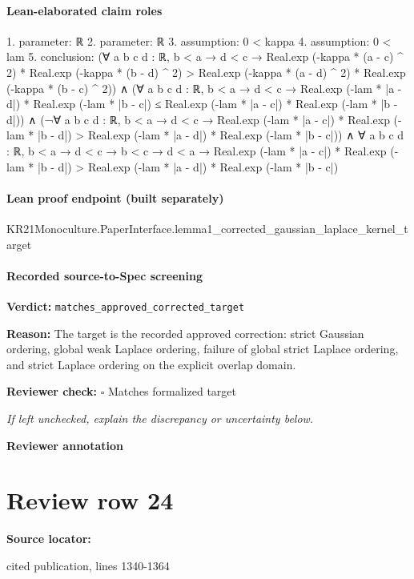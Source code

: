 \documentclass[10pt]{article}
\newcommand{\reviewerbox}{%
  \par\noindent\fbox{\parbox{0.96\linewidth}{\rule{0pt}{0.38in}}}\par
}
\newcommand{\reviewmatch}[1]{%
  \par\noindent\textbf{Reviewer check:} $\square$\; #1\par
  \noindent\emph{If left unchecked, explain the discrepancy or uncertainty below.}\par
}
\begin{document}
\paragraph{Lean-elaborated claim roles}\begin{ReviewVerbatim}
1. parameter: ℝ
2. parameter: ℝ
3. assumption: 0 < kappa
4. assumption: 0 < lam
5. conclusion: (∀ {{a b c d : ℝ}},
    b < a →
      d < c →
        Real.exp (-kappa * (a - c) ^ 2) * Real.exp (-kappa * (b - d) ^ 2) >
          Real.exp (-kappa * (a - d) ^ 2) * Real.exp (-kappa * (b - c) ^ 2)) ∧
  (∀ {{a b c d : ℝ}},
      b < a →
        d < c →
          Real.exp (-lam * |a - d|) * Real.exp (-lam * |b - c|) ≤
            Real.exp (-lam * |a - c|) * Real.exp (-lam * |b - d|)) ∧
    (¬∀ {{a b c d : ℝ}},
          b < a →
            d < c →
              Real.exp (-lam * |a - c|) * Real.exp (-lam * |b - d|) >
                Real.exp (-lam * |a - d|) * Real.exp (-lam * |b - c|)) ∧
      ∀ {a b c d : ℝ},
        b < a →
          d < c →
            b < c →
              d < a →
                Real.exp (-lam * |a - c|) * Real.exp (-lam * |b - d|) >
                  Real.exp (-lam * |a - d|) * Real.exp (-lam * |b - c|)
\end{ReviewVerbatim}

\paragraph{Lean proof endpoint (built separately)}\begin{ReviewVerbatim}
KR21Monoculture.PaperInterface.lemma1_corrected_gaussian_laplace_kernel_target
\end{ReviewVerbatim}

\paragraph{Recorded source-to-Spec screening}
\textbf{Verdict:} \texttt{matches\_approved\_corrected\_target}
\\
{\raggedright
\textbf{Reason:} The target is the recorded approved correction:\allowbreak{} strict Gaussian ordering, global weak Laplace ordering, failure of global strict Laplace ordering, and strict Laplace ordering on the explicit overlap domain.\allowbreak{}
\par}
\reviewmatch{Matches formalized target}
\noindent\textbf{Reviewer annotation}\par
\reviewerbox
\clearpage
\hypertarget{source-claim-e077005933af7923}{}
\section*{Review row 24}
\textbf{Source locator:} {\footnotesize\raggedright cited publication, lines 1340-\allowbreak{}1364\par}
\end{document}
